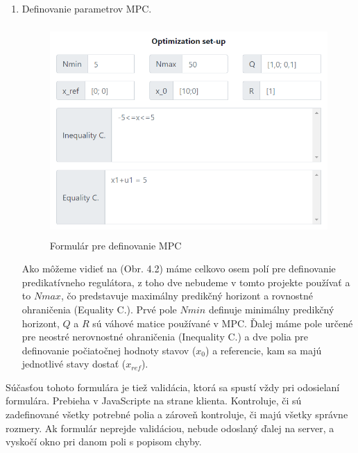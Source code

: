 \begin{enumerate}
{}
\item {Definovanie parametrov MPC.
\begin{figure}[H]	
	\centering
	\includegraphics[width=11cm,height=8cm]{images/MPC_setup}
	\caption{Formulár pre definovanie MPC}
\end{figure}
Ako môžeme vidieť na (Obr. 4.2) máme celkovo osem polí pre definovanie predikatívneho regulátora, z toho dve nebudeme v tomto projekte používať a to $Nmax$, čo predstavuje maximálny predikčný horizont a rovnostné ohraničenia (Equality C.). Prvé pole $Nmin$ definuje minimálny predikčný horizont, $Q$ a $R$ sú váhové matice používané v MPC. Ďalej máme pole určené pre neostré nerovnostné ohraničenia (Inequality C.) a dve polia pre definovanie počiatočnej hodnoty stavov ($x_{0}$) a referencie, kam sa majú jednotlivé stavy dostať ($x_{ref}$).
}
\end{enumerate}
Súčasťou tohoto formulára je tiež validácia, ktorá sa spustí vždy pri odosielaní formulára. Prebieha v JavaScripte na strane klienta. Kontroluje, či sú zadefinované všetky potrebné polia a zároveň kontroluje, či majú všetky správne rozmery. Ak formulár neprejde validáciou, nebude odoslaný ďalej na server, a vyskočí okno pri danom poli s popisom chyby.
